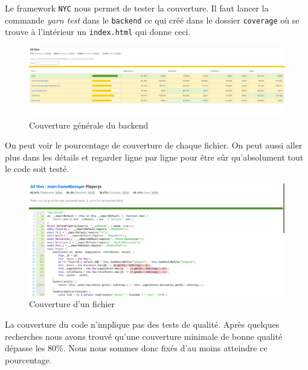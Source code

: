 Le framework \lstinline{NYC} nous permet de tester la couverture. Il faut lancer la commande \emph{yarn test} dans le \lstinline{backend} ce qui créé dans le dossier \lstinline{coverage} où se trouve à l'intérieur un \lstinline{index.html} qui donne ceci.

\begin{figure}[H]
    \centering
    \includegraphics[scale=0.35]{data/couverture_test_1.jpg}
    \caption{Couverture générale du backend}
\end{figure}

On peut voir le pourcentage de couverture de chaque fichier. On peut aussi aller plus dans les détails et regarder ligne par ligne pour être sûr qu'absolument tout le code soit testé.

\begin{figure}[H]
    \centering
    \includegraphics[scale=0.3]{data/couverture_test_2.png}
    \caption{Couverture d'un fichier}
\end{figure}

La couverture du code n'implique pas des tests de qualité. Après quelques recherches nous avons trouvé qu'une couverture minimale de bonne qualité dépasse les 80\%. Nous nous sommes donc fixés d'au moins atteindre ce pourcentage.